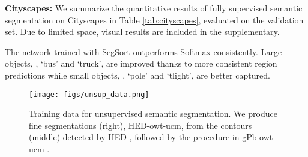 \documentclass[10pt,twocolumn,letterpaper]{article}
\begin{document}
\vspace{-6pt}
\noindent \textbf{Cityscapes:} We summarize the quantitative results of fully supervised semantic segmentation on Cityscapes \cite{cordts2016cityscapes} in Table \ref{tab:cityscapes}, evaluated on the validation set. Due to limited space, visual results are included in the supplementary. 

The network trained with SegSort outperforms Softmax consistently. Large objects, \eg, `bus' and `truck', are improved thanks to more consistent region predictions while small objects, \eg, `pole' and `tlight', are better captured.







\begin{figure}
    \centering
    \texttt{[image: figs/unsup\_data.png]}
    \caption{Training data for unsupervised semantic segmentation. We produce fine segmentations (right), HED-owt-ucm, from the contours (middle) detected by HED \cite{xie2015holistically}, followed by the procedure in gPb-owt-ucm \cite{malik2001contour}. }
    \label{fig:unsup_data}
\end{figure}



\begin{table}
  \centering
    \vspace{0.5pt}
    \caption{Quantitative results related to unsupervised semantic segmentation on Pascal VOC 2012 validation set. Our unsupervised trained network (2 row) outperforms the baseline (1 row) of directly clustering pretrained features using HED-owt-ucm~\cite{xie2015holistically} and achieves  performance of its supervised counterpart (5 row). Also, the network fine-tuned from unsupervised pre-trained embeddings (4 row) outperforms the one without (3 row) in both mIoU and boundary f-measure.}
    \label{tab:unsupervised}
\end{table}
\end{document}
